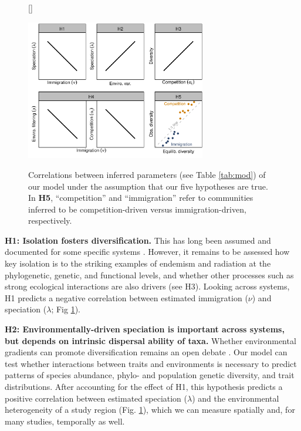 \documentclass[11pt]{article}
\begin{document}
\begin{figure}[!htb]
[\FBwidth]
{\caption{Correlations between inferred parameters (see Table
\ref{tab:mod}) of our model under the assumption that our five
hypotheses are true. In {\bf H5}, ``competition'' and ``immigration''
refer to communities inferred to be competition-driven versus
immigration-driven, respectively.}\label{fig:hyp}}
{\includegraphics[width=0.7\textwidth]{../fig_hyp.pdf}}
\end{figure}

\textbf{H1: Isolation fosters diversification.} This has long been
assumed and documented for some specific systems \cite{Losos2000-xp,
  Wagner2014-qm, Rosindell2011-od}. However, it remains to be assessed
how key isolation is to the striking examples of endemism and
radiation at the phylogenetic, genetic, and functional levels, and
whether other processes such as strong ecological interactions are
also drivers (see H3). Looking across systems, H1 predicts a negative
correlation between estimated immigration ($\nu$) and speciation
($\lambda$; Fig \ref{fig:hyp}).

\textbf{H2: Environmentally-driven speciation is important across
  systems, but depends on intrinsic dispersal ability of taxa.}
Whether environmental gradients can promote diversification remains an
open debate \cite{Mittelbach2007-ui, Ogden2002-jb, Rundle2005-ll}. Our
model can test whether interactions between traits and environments is
necessary to predict patterns of species abundance, phylo- and
population genetic diversity, and trait distributions. After
accounting for the effect of H1, this hypothesis predicts a positive
correlation between estimated speciation ($\lambda$) and the
environmental heterogeneity of a study region (Fig. \ref{fig:hyp}),
which we can measure spatially and, for many studies, temporally as well.
\end{document}
